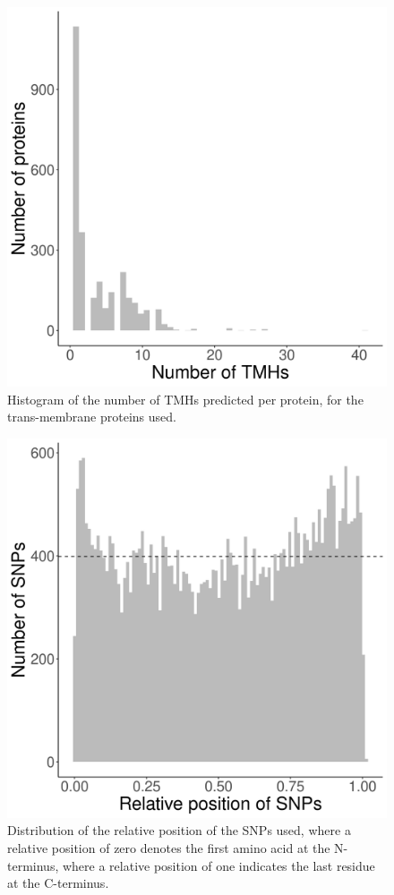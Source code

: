 \begin{figure}[!htbp]
  \includegraphics[width=\textwidth]{ncbi_peregrine_results/fig_n_tmhs_per_protein.png}
  \caption{
    Histogram of the number of TMHs predicted per protein,
    for the trans-membrane proteins used.
  }
  \label{fig:fig_n_tmhs_per_protein}
\end{figure}

\begin{figure}[!htbp]
  \includegraphics[width=\textwidth]{ncbi_peregrine_results/fig_snp_rel_pos.png}
  \caption{
    Distribution of the relative position of the SNPs used,
    where a relative position of zero denotes the first amino
    acid at the N-terminus, where a relative position of one
    indicates the last residue at the C-terminus.
  }
  \label{fig:snp_rel_pos}
\end{figure}

